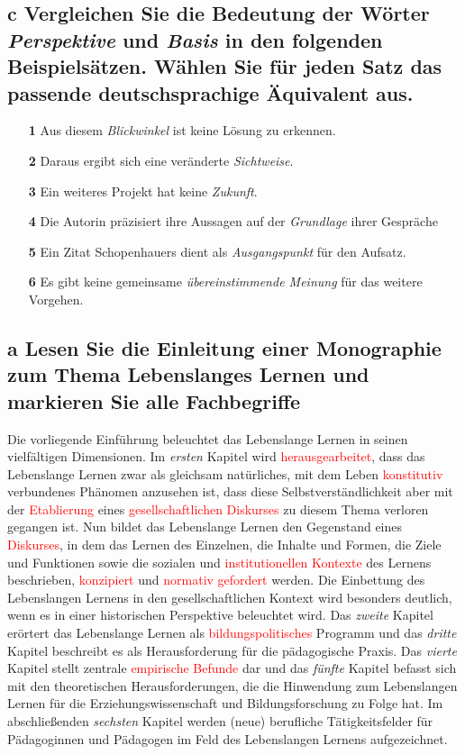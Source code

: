 \documentclass{article}
\begin{document}
	\subsection*{\textbf{c}  Vergleichen Sie die Bedeutung der Wörter \textit{Perspektive} und \textit{Basis} in den folgenden Beispielsätzen. Wählen Sie für jeden Satz das passende deutschsprachige Äquivalent aus.}
	\begin{itemize}
		\item[\textbf{1}]{Aus diesem \textit{Blickwinkel} ist keine Lösung zu erkennen.}
		\item[\textbf{2}]{Daraus ergibt sich eine veränderte \textit{Sichtweise}.}
		\item[\textbf{3}]{Ein weiteres Projekt hat keine \textit{Zukunft}.}
		\item[\textbf{4}]{Die Autorin präzisiert ihre Aussagen auf der \textit{Grundlage} ihrer Gespräche}
		\item[\textbf{5}]{Ein Zitat Schopenhauers dient als \textit{Ausgangspunkt} für den Aufsatz.}
		\item[\textbf{6}]{Es gibt keine gemeinsame \textit{übereinstimmende Meinung} für das weitere Vorgehen.}
	\end{itemize}
	\subsection*{\textbf{a}  Lesen Sie die Einleitung einer Monographie zum Thema Lebenslanges Lernen und markieren Sie alle Fachbegriffe}
	Die vorliegende Einführung beleuchtet das Lebenslange Lernen in seinen vielfältigen Dimensionen. Im \textit{ersten} Kapitel wird \textcolor{red}{herausgearbeitet}, dass das Lebenslange Lernen zwar als gleichsam natürliches, mit dem Leben \textcolor{red}{konstitutiv} verbundenes Phänomen anzusehen ist, dass diese Selbstverständlichkeit aber mit der \textcolor{red}{Etablierung} eines \textcolor{red}{gesellschaftlichen Diskurses} zu diesem Thema verloren gegangen ist. Nun bildet das Lebenslange Lernen den Gegenstand eines \textcolor{red}{Diskurses}, in dem das Lernen des Einzelnen, die Inhalte und Formen, die Ziele und Funktionen sowie die sozialen und \textcolor{red}{institutionellen Kontexte} des Lernens beschrieben, \textcolor{red}{konzipiert} und \textcolor{red}{normativ gefordert} werden. Die Einbettung des Lebenslangen Lernens in den gesellschaftlichen Kontext wird besonders deutlich, wenn es in einer historischen Perspektive beleuchtet wird. Das \textit{zweite} Kapitel erörtert das Lebenslange Lernen als \textcolor{red}{bildungspolitisches} Programm und das \textit{dritte} Kapitel beschreibt es als Herausforderung für die pädagogische Praxis. Das \textit{vierte} Kapitel stellt zentrale \textcolor{red}{empirische Befunde} dar und das \textit{fünfte} Kapitel befasst sich mit den theoretischen Herausforderungen, die die Hinwendung zum Lebenslangen Lernen für die Erziehungswissenschaft und Bildungsforschung zu Folge hat. Im abschließenden \textit{sechsten} Kapitel werden (neue) berufliche Tätigkeitsfelder für Pädagoginnen und Pädagogen im Feld des Lebenslangen Lernens aufgezeichnet. \\
\end{document}
